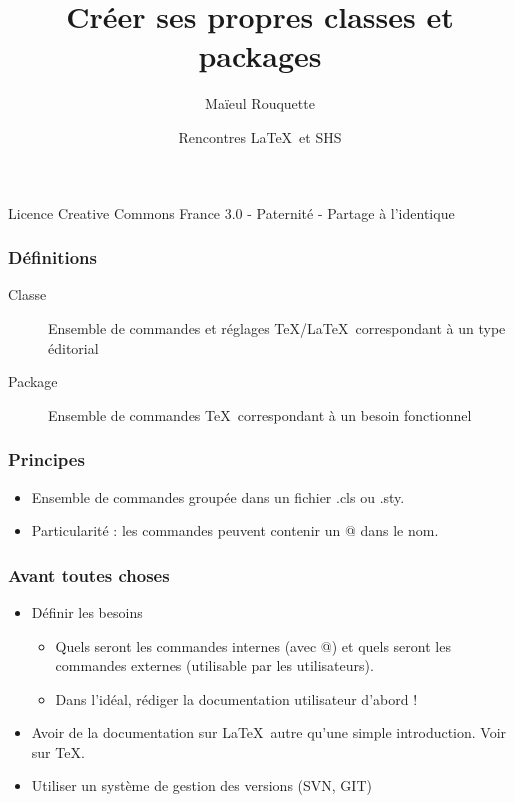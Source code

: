 \documentclass{beamer}
\author{Maïeul Rouquette}
\date{Rencontres \LaTeX\ et SHS}
\title{Créer ses propres classes et packages}
\institute{Université de Lausanne --- IRSB}
\begin{document}
\begin{frame}
	\titlepage
	\vfill
	{\tiny Licence Creative Commons France 3.0 - Paternité - Partage à l'identique}
\end{frame}


\begin{frame}
	\frametitle{Définitions}
	\begin{description}
		\item[Classe]Ensemble de commandes et réglages \TeX/\LaTeX\ correspondant à un type éditorial
		\item[Package]Ensemble de commandes \TeX\ correspondant à un besoin fonctionnel
	\end{description}
\end{frame}

\begin{frame}
	\frametitle{Principes}
	\begin{itemize}
		\item<1->Ensemble de commandes groupée dans un fichier .cls ou .sty.
		\item<2->Particularité : les commandes peuvent contenir un @ dans le nom.
	\end{itemize}
\end{frame}

\begin{frame}
	\frametitle{Avant toutes choses}
	\begin{itemize}
		\item<1->Définir les besoins
			\begin{itemize}
				\item<2->Quels seront les commandes internes (avec @) et quels seront les commandes externes (utilisable par les utilisateurs).
				\item<3->Dans l'idéal, rédiger la documentation utilisateur d'abord !
			\end{itemize}
		\item<4->Avoir de la documentation sur \LaTeX\ autre qu'une simple introduction. Voir sur \TeX.
		\item<5->Utiliser un système de gestion des versions (SVN, GIT)
	\end{itemize}
\end{frame}
\end{document}

